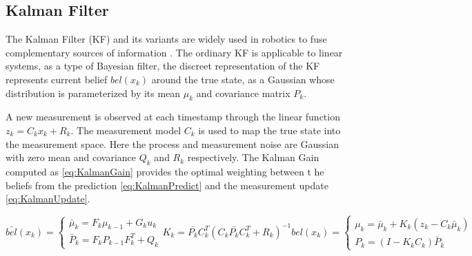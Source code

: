         
        \pagebreak{}
        \subsection{Kalman Filter}
        The Kalman Filter (KF) and its variants  are widely used in robotics to fuse 
        complementary sources of information \cite{Thrun2005ProbabilisticRobotics} \cite{perez2023quadcopter} \cite{Moore2014AGE}.
        The ordinary KF is applicable to linear systems, as a type of Bayesian filter, 
        the discreet representation of the KF represents current belief $bel(x_k)$ around the true state,
        as a Gaussian whose distribution is parameterized by its mean $\mu_k$ and covariance matrix $P_k$.

        A new measurement is observed at each timestamp through the linear function $z_k = C_k x_k + R_k$. 
        The measurement model $C_k$ is used to map the true state into the measurement space.
        Here the process and measurement noise are Gaussian with zero mean and covariance $Q_k$ and $R_k$ respectively. 
        The Kalman Gain computed as \ref{eq:KalmanGain} provides the optimal weighting between t
        he beliefs from the prediction \ref{eq:KalmanPredict} and the measurement update \ref{eq:KalmanUpdate}.
        

        \begin{subequations}
            \begin{equation}
                \bar{bel}(x_k) = \begin{cases}
                        \bar{\mu}_k = F_k \mu_{k-1} + G_k u_k \\
                        \bar{P}_k = F_k P_{k-1} F_k^T + Q_k
                        \end{cases}
                \label{eq:KalmanPredict}
            \end{equation}
            \begin{equation}
                K_k = \bar{P_k} C_k^T \left(C_k \bar{P_k} C_k^T + R_k \right)^{-1}
                \label{eq:KalmanGain}
            \end{equation}
            \begin{equation}
            bel(x_k) = \begin{cases}
                \mu_k = \bar{\mu}_k + K_k \left(z_k - C_k \bar{\mu}_k \right) \\
                P_k = \left(I - K_k C_k \right) \bar{P}_k
            \end{cases}
            \label{eq:KalmanUpdate}
            \end{equation}
            \label{eq:KalmanAlgorithm}
        \end{subequations}
     
